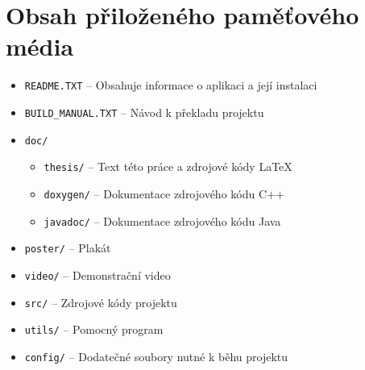 
\chapter{Obsah přiloženého paměťového média}
\begin{itemize}
\item \texttt{README.TXT} -- Obsahuje informace o aplikaci a její instalaci
\item \texttt{BUILD\_MANUAL.TXT} -- Návod k překladu projektu
\item \texttt{doc/}
    \begin{itemize}
        \item \texttt{thesis/} -- Text této práce a zdrojové kódy \LaTeX
        \item \texttt{doxygen/} -- Dokumentace zdrojového kódu C++
        \item \texttt{javadoc/} -- Dokumentace zdrojového kódu Java
    \end{itemize}
\item \texttt{poster/} -- Plakát
\item \texttt{video/} -- Demonstrační video
\item \texttt{src/} -- Zdrojové kódy projektu
\item \texttt{utils/} -- Pomocný program
\item \texttt{config/} -- Dodatečné soubory nutné k běhu projektu
\end{itemize}




